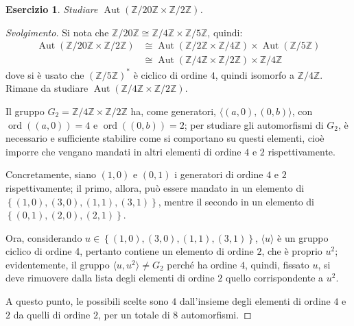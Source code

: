 \documentclass[12pt]{scrartcl}
\theoremstyle{style}
\newtheorem{esercizio}{Esercizio}[section]
\newenvironment{svolgimento}{\renewcommand\qedsymbol{$\blacksquare$}\begin{proof}[Svolgimento]}{\end{proof}}
\numberwithin{equation}{subsection}
\begin{document}
\begin{esercizio}
Studiare $\operatorname{Aut} (\mathbb{Z} / 20 \mathbb{Z} \times \mathbb{Z} / 2 \mathbb{Z})$.
\end{esercizio}
\begin{svolgimento}
	Si nota che $\mathbb{Z} / 20 \mathbb{Z}\cong \mathbb{Z}/4 \mathbb{Z} \times  \mathbb{Z} / 5 \mathbb{Z}$, quindi:
	\[
		\begin{split}
			\operatorname{Aut} (\mathbb{Z}/20\mathbb{Z}\times \mathbb{Z}/2\mathbb{Z})&\cong \operatorname{Aut} (\mathbb{Z}/2\mathbb{Z} \times \mathbb{Z} / 4\mathbb{Z}) \times \operatorname{Aut} (\mathbb{Z}/5\mathbb{Z}) \\
												 &\cong\operatorname{Aut} (\mathbb{Z}/4\mathbb{Z}\times \mathbb{Z}/2\mathbb{Z}) \times \mathbb{Z}/4\mathbb{Z}
		\end{split}
	\] 
	dove si \`e usato che $(\mathbb{Z}/5\mathbb{Z})^*$ \`e ciclico di ordine $4$, quindi isomorfo a $\mathbb{Z}/4\mathbb{Z}$.
	Rimane da studiare $\operatorname{Aut} (\mathbb{Z}/4\mathbb{Z}\times \mathbb{Z}/2\mathbb{Z})$.

	Il gruppo $G_2 = \mathbb{Z}/4\mathbb{Z} \times  \mathbb{Z}/2\mathbb{Z}$ ha, come generatori, $\langle (a,0),(0,b) \rangle$, con $\operatorname{ord}((a,0)) = 4$ e $\operatorname{ord}((0,b)) =2$; per studiare gli automorfismi di $G_2$, \`e necessario e sufficiente stabilire come si comportano su questi elementi, cio\`e imporre che vengano mandati in altri elementi di ordine $4$ e $2 $ rispettivamente.

	Concretamente, siano $(1,0)$ e $(0,1)$ i generatori di ordine $4$ e $2 $ rispettivamente; il primo, allora, pu\`o essere mandato in un elemento di $\left\{ (1,0), (3,0),(1,1),(3,1) \right\} $, mentre il secondo in un elemento di $\left\{ (0,1), (2,0) , (2,1) \right\} $.

	Ora, considerando $u \in \left\{ (1,0), (3,0),(1,1),(3,1) \right\} $, $\langle u \rangle$ \`e un gruppo ciclico di ordine 4, pertanto contiene un elemento di ordine $2$, che \`e proprio $u^2$; evidentemente, il gruppo $\langle u,u^2 \rangle\neq G_2$ perch\'e ha ordine $4$, quindi, fissato $u$, si deve rimuovere dalla lista degli elementi di ordine $2$ quello corrispondente a $u^2$.

	A questo punto, le possibili scelte sono $4$ dall'insieme degli elementi di ordine $4$ e $2 $ da quelli di ordine $2$, per un totale di $8$ automorfismi.


\end{svolgimento}
\end{document}
